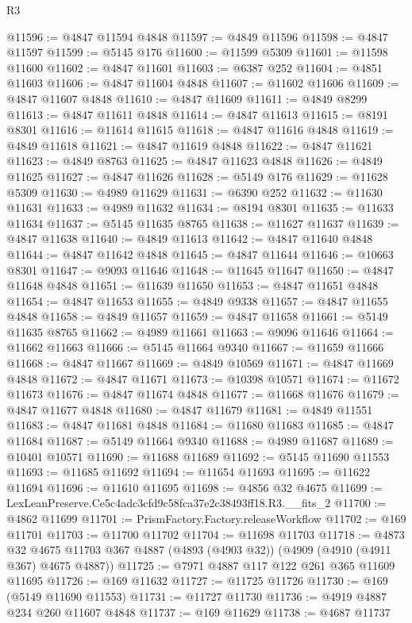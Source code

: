\begin{lexlean}{R3}
\begin{coremodule}
@11596 := @4847 @11594 @4848
@11597 := @4849 @11596
@11598 := @4847 @11597
@11599 := @5145 @176
@11600 := @11599 @5309
@11601 := @11598 @11600
@11602 := @4847 @11601
@11603 := @6387 @252
@11604 := @4851 @11603
@11606 := @4847 @11604 @4848
@11607 := @11602 @11606
@11609 := @4847 @11607 @4848
@11610 := @4847 @11609
@11611 := @4849 @8299
@11613 := @4847 @11611 @4848
@11614 := @4847 @11613
@11615 := @8191 @8301
@11616 := @11614 @11615
@11618 := @4847 @11616 @4848
@11619 := @4849 @11618
@11621 := @4847 @11619 @4848
@11622 := @4847 @11621
@11623 := @4849 @8763
@11625 := @4847 @11623 @4848
@11626 := @4849 @11625
@11627 := @4847 @11626
@11628 := @5149 @176
@11629 := @11628 @5309
@11630 := @4989 @11629
@11631 := @6390 @252
@11632 := @11630 @11631
@11633 := @4989 @11632
@11634 := @8194 @8301
@11635 := @11633 @11634
@11637 := @5145 @11635 @8765
@11638 := @11627 @11637
@11639 := @4847 @11638
@11640 := @4849 @11613
@11642 := @4847 @11640 @4848
@11644 := @4847 @11642 @4848
@11645 := @4847 @11644
@11646 := @10663 @8301
@11647 := @9093 @11646
@11648 := @11645 @11647
@11650 := @4847 @11648 @4848
@11651 := @11639 @11650
@11653 := @4847 @11651 @4848
@11654 := @4847 @11653
@11655 := @4849 @9338
@11657 := @4847 @11655 @4848
@11658 := @4849 @11657
@11659 := @4847 @11658
@11661 := @5149 @11635 @8765
@11662 := @4989 @11661
@11663 := @9096 @11646
@11664 := @11662 @11663
@11666 := @5145 @11664 @9340
@11667 := @11659 @11666
@11668 := @4847 @11667
@11669 := @4849 @10569
@11671 := @4847 @11669 @4848
@11672 := @4847 @11671
@11673 := @10398 @10571
@11674 := @11672 @11673
@11676 := @4847 @11674 @4848
@11677 := @11668 @11676
@11679 := @4847 @11677 @4848
@11680 := @4847 @11679
@11681 := @4849 @11551
@11683 := @4847 @11681 @4848
@11684 := @11680 @11683
@11685 := @4847 @11684
@11687 := @5149 @11664 @9340
@11688 := @4989 @11687
@11689 := @10401 @10571
@11690 := @11688 @11689
@11692 := @5145 @11690 @11553
@11693 := @11685 @11692
@11694 := @11654 @11693
@11695 := @11622 @11694
@11696 := @11610 @11695
@11698 := @4856 @32 @4675
@11699 := LexLeanPreserve.Ce5c4adc3cfd9c58fca37e2c38493ff18.R3.__fits_2
@11700 := @4862 @11699
@11701 := PrismFactory.Factory.releaseWorkflow
@11702 := @169 @11701
@11703 := @11700 @11702
@11704 := @11698 @11703
@11718 := @4873
    @32
    @4675
    @11703
    @367
    @4887
    (@4893 (@4903 @32))
    (@4909 (@4910 (@4911 @367) @4675 @4887))
@11725 := @7971 @4887 @117 @122 @261 @365 @11609 @11695
@11726 := @169 @11632
@11727 := @11725 @11726
@11730 := @169 (@5149 @11690 @11553)
@11731 := @11727 @11730
@11736 := @4919 @4887 @234 @260 @11607 @4848
@11737 := @169 @11629
@11738 := @4687 @11737

\end{coremodule}
\end{lexlean}
